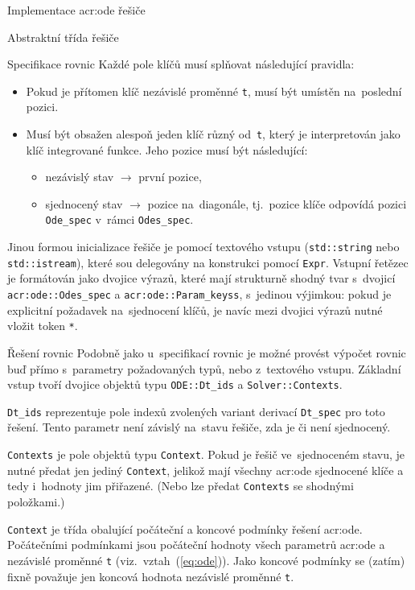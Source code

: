 \documentclass[thesis=M,czech]{FITthesis}[2012/06/26]
\newcommand{\acrlabel}[1]{acr:#1}
\newcommand{\acr}[1]{\acrshort{\acrlabel{#1}}}
\newcommand{\id}[1]{\texttt{#1}}
\newcommand{\rf}[1]{\ref{#1}}
\newcommand{\rfeq}[1]{(\rf{eq:#1})}
\begin{document}
\begin{section}{Implementace \acr{ode} řešiče}
\begin{subsection}{Abstraktní třída řešiče}
\begin{subsubsection}{Specifikace rovnic}
Každé pole klíčů musí splňovat následující pravidla:
\begin{itemize}
\item Pokud je přítomen klíč nezávislé proměnné \id{t},
   musí být umístěn na~poslední pozici.
\item Musí být obsažen alespoň jeden klíč různý od~\id{t},
   který je interpretován jako klíč integrované funkce.
   Jeho pozice musí být následující:
   \begin{itemize}
   \item nezávislý stav $\rightarrow$ první pozice,
   \item sjednocený stav  $\rightarrow$ pozice na~diagonále,
      tj.~pozice klíče odpovídá pozici \id{Ode\_\-spec}
      v~rámci \id{Odes\_\-spec}.
   \end{itemize}
\end{itemize}

Jinou formou inicializace řešiče
je pomocí textového vstupu
(\id{std::\-string} nebo \id{std::\-istream}),
které sou delegovány na konstrukci pomocí \id{Expr}.
Vstupní řetězec je formátován jako dvojice výrazů,
které mají strukturně shodný tvar
s~dvojicí \id{\acr{ode}::\-Odes\_\-spec}
a \id{\acr{ode}::\-Param\_\-keyss},
s~jedinou výjimkou: pokud je explicitní požadavek
na~sjednocení klíčů, je navíc mezi dvojici výrazů
nutné vložit token \id{*}.
\end{subsubsection} %


\begin{subsubsection}{Řešení rovnic}\label{sss:impl:ode:solver:solve}
Podobně jako u~specifikací rovnic
je možné provést výpočet rovnic
buď přímo s~parametry požadovaných typů,
nebo z~textového vstupu.
Základní vstup tvoří dvojice objektů
typu \id{ODE::\-Dt\_\-ids} a \id{Solver::\-Contexts}.

\id{Dt\_\-ids} reprezentuje pole indexů
zvolených variant derivací \id{Dt\_\-spec}
pro toto řešení.
Tento parametr není závislý na~stavu řešiče,
zda je či není sjednocený.

\id{Contexts} je pole objektů typu \id{Context}.
Pokud je řešič ve~sjednoceném stavu,
je nutné předat jen jediný \id{Context},
jelikož mají všechny \acr{ode} sjednocené klíče
a tedy i~hodnoty jim přiřazené.
(Nebo lze předat \id{Contexts} se shodnými položkami.)


\begin{paragraph}{\id{Context}}\label{p:impl:ode:solver:solve:ctx}
je třída obalující počáteční a koncové podmínky
řešení \acr{ode}.
Počátečními podmínkami
jsou počáteční hodnoty všech parametrů \acr{ode}
a nezávislé proměnné \id{t}
(viz.~vztah~\rfeq{ode}).
Jako koncové podmínky se (zatím)
fixně považuje jen koncová hodnota
nezávislé proměnné \id{t}.


\end{paragraph}
\end{subsubsection}
\end{subsection}
\end{section}
\end{document}
